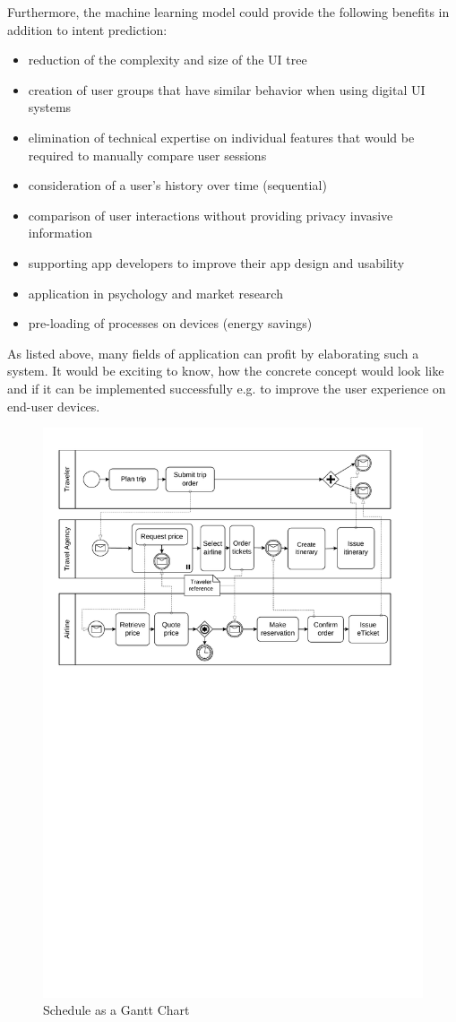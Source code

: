 Furthermore, the machine learning model could provide the following benefits in addition to intent prediction:
\begin{itemize}
  \item reduction of the complexity and size of the UI tree
  \item creation of user groups that have similar behavior when using digital UI systems \cite{jayarajah2015need}
  \item elimination of technical expertise on individual features that would be required to manually compare user sessions \cite{ghods2019activity2vec}
  \item consideration of a user's history over time (sequential)
  \item comparison of user interactions without providing privacy invasive information
  \item supporting app developers to improve their app design and usability
  \item application in psychology and market research
  \item pre-loading of processes on devices (energy savings) \cite{shen2019deepapp}
\end{itemize}

As listed above, many fields of application can profit by elaborating such a system. It would be exciting to know, how the concrete concept would look like and if it can be implemented successfully e.g. to improve the user experience on end-user devices.

\begin{figure}
  \centering
  \includegraphics[width=\textwidth]{graphics/choreography.pdf}
  \caption{Schedule as a Gantt Chart}
  \label{fig:schedule}
\end{figure}
